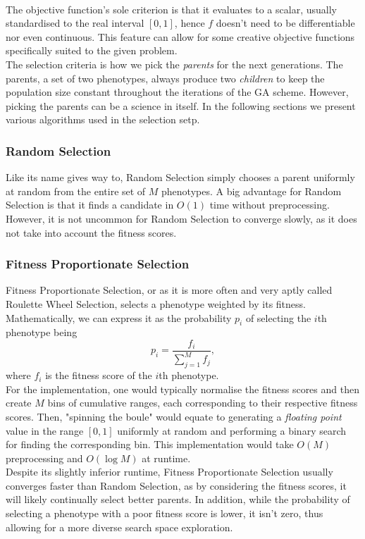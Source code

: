 \\
The objective function's sole criterion is that it evaluates to a scalar, usually standardised to the real interval $[0,1]$, hence $f$ doesn't need to be differentiable nor even continuous. This feature can allow for some creative objective functions specifically suited to the given problem.
\\
The selection criteria is how we pick the \textit{parents} for the next generations. The parents, a set of two phenotypes, always produce two \textit{children} to keep the population size constant throughout the iterations of the GA scheme. However, picking the parents can be a science in itself. In the following sections we present various algorithms used in the selection setp.

\subsubsection{Random Selection}
Like its name gives way to, Random Selection simply chooses a parent uniformly at random from the entire set of $M$ phenotypes. A big advantage for Random Selection is that it finds a candidate in $O(1)$ time without preprocessing. However, it is not uncommon for Random Selection to converge slowly, as it does not take into account the fitness scores. 

\subsubsection{Fitness Proportionate Selection}
Fitness Proportionate Selection, or as it is more often and very aptly called Roulette Wheel Selection, selects a phenotype weighted by its fitness. Mathematically, we can express it as the probability $p_i$ of selecting the $i$th phenotype being
\begin{equation*}
    p_i = \frac{f_i}{\sum_{j = 1}^M f_j},
\end{equation*}
where $f_i$ is the fitness score of the $i$th phenotype.
\\
For the implementation, one would typically normalise the fitness scores and then create $M$ bins of cumulative ranges, each corresponding to their respective fitness scores. Then, "spinning the boule" would equate to generating a \textit{floating point} value in the range $[0,1]$ uniformly at random and performing a binary search for finding the corresponding bin. This implementation would take $O(M)$ preprocessing and $O(\log M )$ at runtime. 
\\
Despite its slightly inferior runtime, Fitness Proportionate Selection usually converges faster than Random Selection, as by considering the fitness scores, it will likely continually select better parents. In addition, while the probability of selecting a phenotype with a poor fitness score is lower, it isn't zero, thus allowing for a more diverse search space exploration.   

